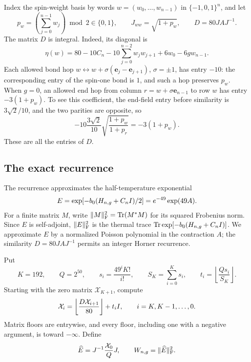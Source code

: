 Index the spin-weight basis by words $w=(w_0,\ldots,w_{n-1})$ in
$\{-1,0,1\}^n$, and let
\[
 p_w=\left(\sum_{j=0}^{n-1}w_j\right)\bmod2\in\{0,1\},
 \qquad J_{ww}=\sqrt{1+p_w},\qquad D=80JAJ^{-1}.
\]
The matrix $D$ is integral. Indeed, its diagonal is
\begin{equation}\label{appth:diagonal}
 \eta(w)=80-10C_n-10\sum_{j=0}^{n-2}w_jw_{j+1}
                  +6w_0-6g w_{n-1}.
\end{equation}
Each allowed bond hop $w\leftrightarrow
w+\sigma(\mathbf e_j-\mathbf e_{j+1})$, $\sigma=\pm1$, has entry $-10$:
the corresponding entry of the spin-one bond is $1$, and such a hop
preserves $p_w$. When $g=0$, an allowed end hop from column
$r=w+\sigma\mathbf e_{n-1}$ to row $w$ has entry $-3(1+p_w)$.
To see this coefficient, the end-field entry before similarity
is $3\sqrt2/10$, and the two parities are opposite, so
\[
 -10\frac{3\sqrt2}{10}
       \sqrt{\frac{1+p_w}{1+p_r}}=-3(1+p_w).
\]
These are all the entries of $D$.

\subsection{The exact recurrence}

The recurrence approximates the half-temperature exponential
\[
 E=\exp[-b_0(H_{n,g}+C_nI)/2]=e^{-49}\exp(49A).
\]
For a finite matrix $M$, write $\|M\|_{\rm F}^2=\operatorname{Tr}(M^*M)$ for
its squared Frobenius norm. Since $E$ is self-adjoint, $\|E\|_{\rm F}^2$
is the thermal trace $\operatorname{Tr}\exp[-b_0(H_{n,g}+C_nI)]$. We approximate
$E$ by a normalized Poisson polynomial in the contraction $A$;
the similarity $D=80JAJ^{-1}$ permits an integer Horner recurrence.

Put
\begin{equation}\label{appth:coefficients}
 K=192,\qquad Q=2^{50},\qquad
 s_i=\frac{49^iK!}{i!},\qquad S_K=\sum_{i=0}^Ks_i,
 \qquad t_i=\left\lfloor\frac{Qs_i}{S_K}\right\rfloor.
\end{equation}
Starting with the zero matrix $\mathcal X_{K+1}$, compute
\begin{equation}\label{appth:horner}
 \mathcal X_i=
       \left\lfloor\frac{D\mathcal X_{i+1}}{80}\right\rfloor+t_iI,
 \qquad i=K,K-1,\ldots,0.
\end{equation}
Matrix floors are entrywise, and every floor, including one with a negative
argument, is toward $-\infty$. Define
\begin{equation}\label{appth:W}
 \widehat E=J^{-1}\frac{\mathcal X_0}{Q}J,
 \qquad W_{n,g}=\|\widehat E\|_{\rm F}^2.
\end{equation}

